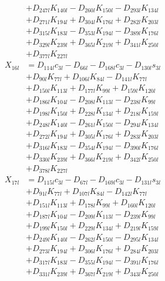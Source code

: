 \begin{multicols}{2}
\begin{align}
&+ D_{247l}K_{140l} - D_{260l}K_{150l} - D_{293l}K_{134l}  \nonumber \\
&+ D_{271l}K_{194l} + D_{304l}K_{176l} + D_{282l}K_{203l}  \nonumber \\
&+ D_{315l}K_{183l} - D_{353l}K_{194l} - D_{389l}K_{176l}  \nonumber \\
&+ D_{329l}K_{239l} + D_{365l}K_{219l} + D_{341l}K_{250l}  \nonumber \\
&+ D_{377l}K_{227l} \nonumber \\
X_{16l} &= D_{114l}c_{3l} - D_{66l} - D_{168l}c_{3l} - D_{130l}s_{3l}  \nonumber \\
&+ D_{90l}K_{77l} + D_{106l}K_{84l} - D_{141l}K_{77l}  \nonumber \\
&+ D_{150l}K_{113l} + D_{177l}K_{99l} + D_{159l}K_{120l}  \nonumber \\
&+ D_{186l}K_{104l} - D_{208l}K_{113l} - D_{238l}K_{99l}  \nonumber \\
&+ D_{198l}K_{150l} + D_{228l}K_{134l} + D_{218l}K_{159l}  \nonumber \\
&+ D_{248l}K_{140l} - D_{261l}K_{150l} - D_{294l}K_{134l}  \nonumber \\
&+ D_{272l}K_{194l} + D_{305l}K_{176l} + D_{283l}K_{203l}  \nonumber \\
&+ D_{316l}K_{183l} - D_{354l}K_{194l} - D_{390l}K_{176l}  \nonumber \\
&+ D_{330l}K_{239l} + D_{366l}K_{219l} + D_{342l}K_{250l}  \nonumber \\
&+ D_{378l}K_{227l} \nonumber \\
X_{17l} &= D_{115l}c_{3l} - D_{67l} - D_{169l}c_{3l} - D_{131l}s_{3l}  \nonumber \\
&+ D_{91l}K_{77l} + D_{107l}K_{84l} - D_{142l}K_{77l}  \nonumber \\
&+ D_{151l}K_{113l} + D_{178l}K_{99l} + D_{160l}K_{120l}  \nonumber \\
&+ D_{187l}K_{104l} - D_{209l}K_{113l} - D_{239l}K_{99l}  \nonumber \\
&+ D_{199l}K_{150l} + D_{229l}K_{134l} + D_{219l}K_{159l}  \nonumber \\
&+ D_{249l}K_{140l} - D_{262l}K_{150l} - D_{295l}K_{134l}  \nonumber \\
&+ D_{273l}K_{194l} + D_{306l}K_{176l} + D_{284l}K_{203l}  \nonumber \\
&+ D_{317l}K_{183l} - D_{355l}K_{194l} - D_{391l}K_{176l}  \nonumber \\
&+ D_{331l}K_{239l} + D_{367l}K_{219l} + D_{343l}K_{250l}  \nonumber \\

\end{align}
\end{multicols}
